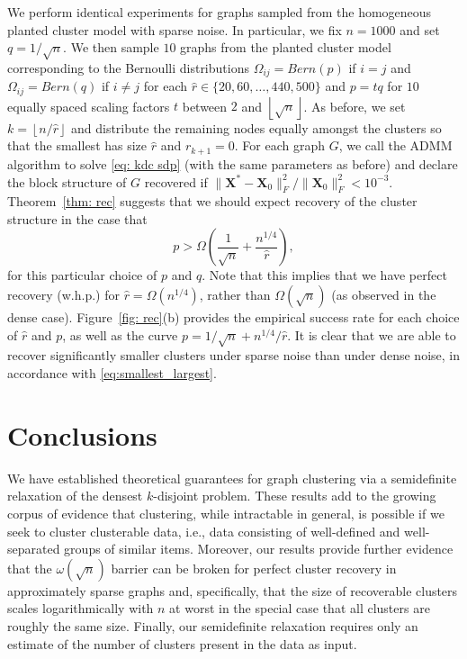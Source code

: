 \documentclass[twoside,11pt]{article}
\newcommand{\bs}{\boldsymbol}
\newcommand{\X}{\bs {X}}
\newcommand{\0}{\bs{0}}
\newcommand{\rbra}[1]{\ensuremath{\left( #1 \right)}} %
\newcommand{\floor}[1]{\ensuremath{\left\lfloor #1 \right\rfloor}}
\begin{document}
We perform identical experiments for graphs sampled from the homogeneous planted cluster model with sparse noise.
In particular, we fix \( n =1000\) and set $q = 1/\sqrt{n}$. We then sample \(10\) graphs
from the planted cluster model corresponding to the Bernoulli
distributions \(\Omega_{ij} = Bern(p)\) if $i =j$ and \(\Omega_{ij} = Bern(q)\) if $i\neq j$ for each
\( \hat r \in \{20,60,\dots, 440, 500\}\) and $p = tq$ for $10$ equally spaced scaling factors $t$ between $2$ and $\floor{\sqrt{n}}$.
As before, we set $k = \floor{n/\hat r}$ and distribute the remaining nodes equally amongst the clusters so that the smallest has size $\hat{r}$ and $r_{k+1} = 0$.
For each graph \(G\), we call the ADMM algorithm to solve \eqref{eq: kdc sdp} (with the same parameters as before)
and declare the block structure of \(G\) recovered if \(\|\X^* - \X_0\|^2_F / \|\X_0\|^2_F < 10^{-3} \).
Theorem~\ref{thm: rec} suggests that we should expect recovery of the cluster structure in the case that
\[
	p >  \Omega\rbra{\frac{1}{\sqrt{n}} + \frac{n^{1/4}}{\hat r}},
\]
for this particular choice of $p$ and $q$.
Note that this implies that we have perfect recovery (w.h.p.) for $\hat r = \Omega(n^{1/4})$, rather than $\Omega(\sqrt{n})$ (as observed in the dense case).
Figure~\ref{fig: rec}(b) provides the empirical success rate for each choice of \(\hat r\) and \(p\), as well as the curve \(p = 1/\sqrt{n} + n^{1/4}/\hat{r}\).
It is clear that we are able to recover significantly smaller clusters under sparse noise than under dense noise, in accordance with \eqref{eq:smallest_largest}.

\section{Conclusions}
\label{sec: con}
We have established theoretical guarantees for graph clustering via a semidefinite relaxation of the densest \(k\)-disjoint problem.
These results add to the growing corpus of evidence that clustering, while intractable in general,
is possible if we seek to cluster clusterable data, i.e., data consisting of well-defined and well-separated groups of similar items.
Moreover, our results provide further evidence that the \(\omega(\sqrt{n})\) barrier can be broken for perfect cluster recovery in approximately sparse graphs and, specifically, that the size of recoverable clusters
scales logarithmically with \(n\) at worst in the special case that all clusters
are roughly the same size.
Finally, our semidefinite relaxation requires only an estimate of the
number of clusters present in the data as input.
\end{document}
